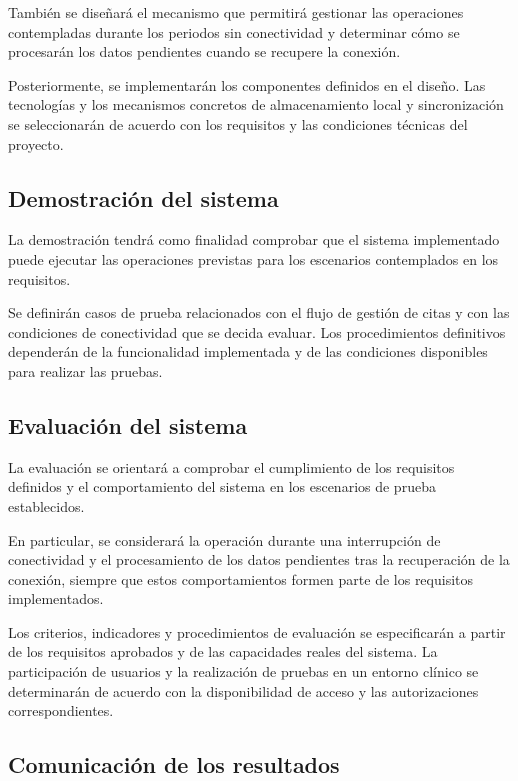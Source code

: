 También se diseñará el mecanismo que permitirá gestionar
las operaciones contempladas durante los periodos sin
conectividad y determinar cómo se procesarán los datos
pendientes cuando se recupere la conexión.

Posteriormente, se implementarán los componentes definidos
en el diseño. Las tecnologías y los mecanismos concretos
de almacenamiento local y sincronización se seleccionarán
de acuerdo con los requisitos y las condiciones técnicas
del proyecto.

\subsection{Demostración del sistema}

La demostración tendrá como finalidad comprobar que el
sistema implementado puede ejecutar las operaciones previstas
para los escenarios contemplados en los requisitos.

Se definirán casos de prueba relacionados con el flujo de
gestión de citas y con las condiciones de conectividad que
se decida evaluar. Los procedimientos definitivos dependerán
de la funcionalidad implementada y de las condiciones
disponibles para realizar las pruebas.

\subsection{Evaluación del sistema}

La evaluación se orientará a comprobar el cumplimiento de
los requisitos definidos y el comportamiento del sistema
en los escenarios de prueba establecidos.

En particular, se considerará la operación durante una
interrupción de conectividad y el procesamiento de los datos
pendientes tras la recuperación de la conexión, siempre
que estos comportamientos formen parte de los requisitos
implementados.

Los criterios, indicadores y procedimientos de evaluación
se especificarán a partir de los requisitos aprobados y de
las capacidades reales del sistema. La participación de
usuarios y la realización de pruebas en un entorno clínico
se determinarán de acuerdo con la disponibilidad de acceso
y las autorizaciones correspondientes.

\subsection{Comunicación de los resultados}

